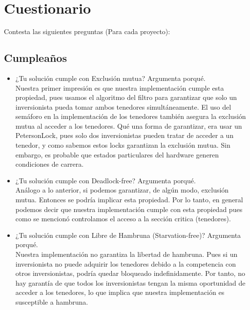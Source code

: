 \documentclass[10pt,letterpaper]{article}
\begin{document}
\section*{Cuestionario}

    Contesta las siguientes preguntas (Para cada proyecto):

    \subsection*{Cumpleaños}

    \begin{itemize}
        \item ¿Tu solución cumple con Exclusión mutua? Argumenta porqué. \\
        Nuestra primer impresión es que nuestra implementación cumple esta propiedad, pues usamos el algoritmo del filtro para garantizar que solo un inversionista pueda tomar ambos tenedores simultáneamente. El uso del semáforo en la implementación de los tenedores también asegura la exclusión mutua al acceder a los tenedores.
        Qué una forma de garantizar, era usar un PetersonLock, pues solo dos inversionistas pueden tratar de acceder a un tenedor, y como sabemos estos locks garantizan la exclusión mutua. Sin embargo, es probable que estados particulares del hardware generen condiciones de carrera.

        \item ¿Tu solución cumple con Deadlock-free? Argumenta porqué.\\
        Análogo a lo anterior, si podemos garantizar, de algún modo, exclusión mutua. Entonces se podría implicar esta propiedad. Por lo tanto, en general podemos decir que nuestra implementación cumple con esta propiedad pues como se mencionó controlamos el acceso a la sección critica (tenedores).

        \item ¿Tu solución cumple con Libre de Hambruna (Starvation-free)? Argumenta porqué.\\
        Nuestra implementación no garantiza la libertad de hambruna. Pues si un inversionista no puede adquirir los tenedores debido a la competencia con otros inversionistas, podría quedar bloqueado indefinidamente. Por tanto, no hay garantía de que todos los inversionistas tengan la misma oportunidad de acceder a los tenedores, lo que implica que nuestra implementación es susceptible a hambruna.
        

\end{itemize}
\end{document}

